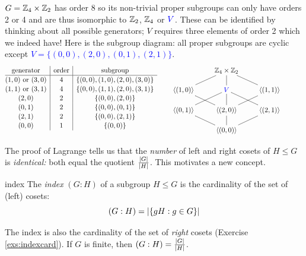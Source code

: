 \begin{example}{}{}
$G=\mathbb{Z}_4\times\mathbb{Z}_2$ has order 8 so its non-trivial proper subgroups can only have orders 2 or 4 and are thus isomorphic to $\mathbb{Z}_2$, $\mathbb{Z}_4$ or $\textcolor{blue}{V}$. These can be identified by thinking about all possible generators; $V$ requires three elements of order 2 which we indeed have! Here is the subgroup diagram: all proper subgroups are cyclic except \textcolor{blue}{$V=\{(0,0),(2,0),(0,1),(2,1)\}$}.
\[
\def\arraystretch{1.1}
	\begin{array}[t]{@{}c|c|c}
	\text{generator}&\text{order}&\text{subgroup}\\\hline
(1,0)\text{ or }(3,0) & 4 & \{(0,0),(1,0),(2,0),(3,0)\}\\
(1,1)\text{ or }(3,1) & 4 & \{(0,0),(1,1),(2,0),(3,1)\}\\
(2,0) & 2 & \{(0,0),(2,0)\}\\
(0,1) & 2 & \{(0,0),(0,1)\}\\
(2,1) & 2 & \{(0,0),(2,1)\}\\
(0,0) & 1 & \{(0,0)\}
	\end{array}
\qquad
\xymatrix @R13pt{&\Z_4\times\Z_2 \ar@/_0pc/@{-}[dl] \ar@{-}[d] \ar@{-}[dr]&\\
	\ip{(1,0)} \ar@{-}[dr] & \textcolor{blue}{V} \ar@{-}[dl] \ar@{-}[d] \ar@{-}[dr] & \ip{(1,1)} \ar@{-}[dl]\\
	\ip{(0,1)} \ar@{-}[dr] & \ip{(2,0)} \ar@{-}[d] & \ip{(2,1)} \ar@{-}[dl] &\\
	&\ip{(0,0)}&}
\]
\end{example}

\goodbreak

The proof of Lagrange tells us that the \emph{number} of left and right cosets of $H\le G$ is \emph{identical:} both equal the quotient $\frac{\left| G\right|}{\left| H\right|}$. This motivates a new concept.

\begin{defn}{}{index}
The \emph{index} $(G:H)$ of a subgroup $H\le G$ is the cardinality of the set of (left) cosets:
\[(G:H)=\left| \{gH:g\in G\}\right|\]
\end{defn}

The index is also the cardinality of the set of \emph{right} cosets (Exercise \ref{exs:indexcard}). If $G$ is finite, then $(G:H)=\frac{\left| G\right|}{\left| H\right|}$.


